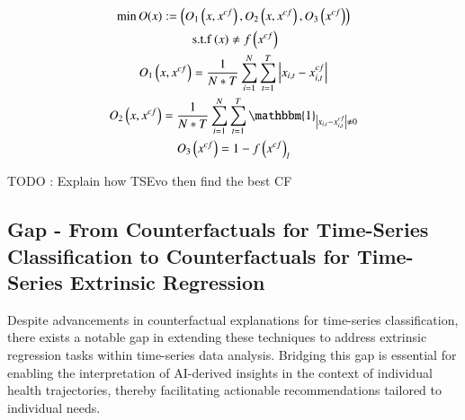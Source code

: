 \begin{multline}
\min O(x):=\left(O_{1}\left(x, x^{c f}\right), O_{2}\left(x, x^{c f}\right), O_{3}\left(x^{c f}\right)\right) \\
\text { s.t.f }(x) \neq f\left(x^{c f}\right) \\
O_{1}\left(x, x^{c f}\right)=\frac{1}{N * T} \sum_{i=1}^{N} \sum_{t=1}^{T}\left|x_{i, t}-x_{i, t}^{c f}\right| \\
O_{2}\left(x, x^{c f}\right)=\frac{1}{N * T} \sum_{i=1}^{N} \sum_{t=1}^{T} \mathbbm{1}_{\left|x_{i, t}-x_{i, t}^{c f}\right| \neq 0} \\
O_{3}\left(x^{c f}\right)=1-f\left(x^{c f}\right)_{l}    \\
\end{multline}

TODO : Explain how TSEvo then find the best CF


\subsection{Gap - From Counterfactuals for Time-Series Classification to Counterfactuals for Time-Series Extrinsic Regression} Despite advancements in counterfactual explanations for time-series classification, there exists a notable gap in extending these techniques to address extrinsic regression tasks within time-series data analysis. Bridging this gap is essential for enabling the interpretation of AI-derived insights in the context of individual health trajectories, thereby facilitating actionable recommendations tailored to individual needs.

